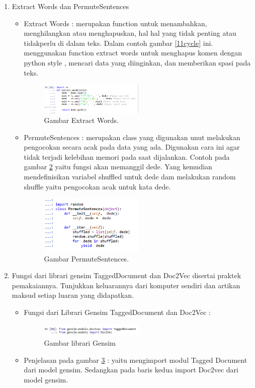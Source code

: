 \begin{enumerate}
\begin{itemize}
		\end{itemize}
\item Extract Words dan PermuteSentences
	\begin{itemize}
	\item Extract Words : merupakan function untuk menambahkan, menghilangkan atau menghapuskan, hal hal yang tidak penting atau tidakperlu di dalam teks. Dalam contoh gambar \ref{11cycle} ini. menggunakan function extract words untuk menghapus komen dengan python style , mencari data yang diinginkan, dan memberikan spasi pada teks.
		\begin{figure}[ht]
		\centerline{\includegraphics[width=0.5\textwidth]{figures/chapter5/14extract.png}}
		\caption{Gambar Extract Words.}	
		\label{14extract}
		\end{figure}
	\item PermuteSentences : merupakan class yang digunakan unut melakukan pengocokan secara acak pada data yang ada. Digunakan cara ini agar tidak terjadi kelebihan memori pada saat dijalankan. Contoh pada gambar \ref{15permute} yaitu fungsi akan memanggil dede. Yang kemudian mendefinisikan variabel shuffled untuk dede dam melakukan random shuffle yaitu pengocokan acak untuk kata dede.
 		\begin{figure}[ht]
		\centerline{\includegraphics[width=0.5\textwidth]{figures/chapter5/15permute.png}}
		\caption{Gambar PermuteSentences.}	
		\label{15permute}
		\end{figure}
		\end{itemize}
\item Fungsi dari librari gensim TaggedDocument dan Doc2Vec disertai praktek pemakaiannya. Tunjukkan keluarannya dari komputer sendiri dan artikan maksud setiap luaran yang didapatkan.
		\begin{itemize}
		\item Fungsi dari Librari Gensim TaggedDocument dan Doc2Vec :
		\begin{figure}[ht]
		\centerline{\includegraphics[width=0.5\textwidth]{figures/chapter5/18gensim.jpg}}
		\caption{Gambar librari Gensim}	
		\label{18gensim}
		\end{figure}
		\item Penjelasan pada gambar \ref{18gensim} : yaitu mengimport modul Tagged Document dari model gensim. Sedangkan pada baris kedua import Doc2vec dari model gensim.
		\end{itemize}


\end{enumerate}
